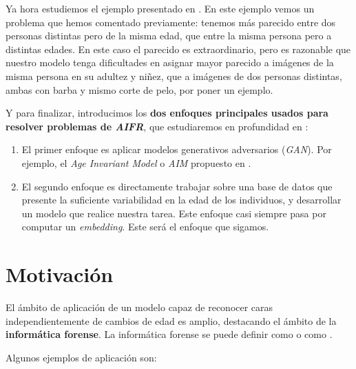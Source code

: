 Ya hora estudiemos el ejemplo presentado en . En este ejemplo vemos un problema que hemos comentado previamente: tenemos más parecido entre dos personas distintas pero de la misma edad, que entre la misma persona pero a distintas edades. En este caso el parecido es extraordinario, pero es razonable que nuestro modelo tenga dificultades en asignar mayor parecido a imágenes de la misma persona en su adultez y niñez, que a imágenes de dos personas distintas, ambas con barba y mismo corte de pelo, por poner un ejemplo.


Y para finalizar, introducimos los \textbf{dos enfoques principales usados para resolver problemas de \textit{AIFR}}, que estudiaremos en profundidad en :

\begin{enumerate}
	\item El primer enfoque es aplicar modelos generativos adversarios (\textit{GAN}). Por ejemplo, el \textit{Age Invariant Model} o \textit{AIM} propuesto en \cite{informatica:tecnica_sintesis_aifr}.
	\item El segundo enfoque es directamente trabajar sobre una base de datos que presente la suficiente variabilidad en la edad de los individuos, y desarrollar un modelo que realice nuestra tarea. Este enfoque casi siempre pasa por computar un \textit{embedding}. Este será el enfoque que sigamos.
\end{enumerate}

\section{Motivación}

El ámbito de aplicación de un modelo capaz de reconocer caras independientemente de cambios de edad es amplio, destacando el ámbito de la \textbf{informática forense}. La informática forense se puede definir como  o como  \cite{informatica:libro_informatica_forense}.

Algunos ejemplos de aplicación son:

